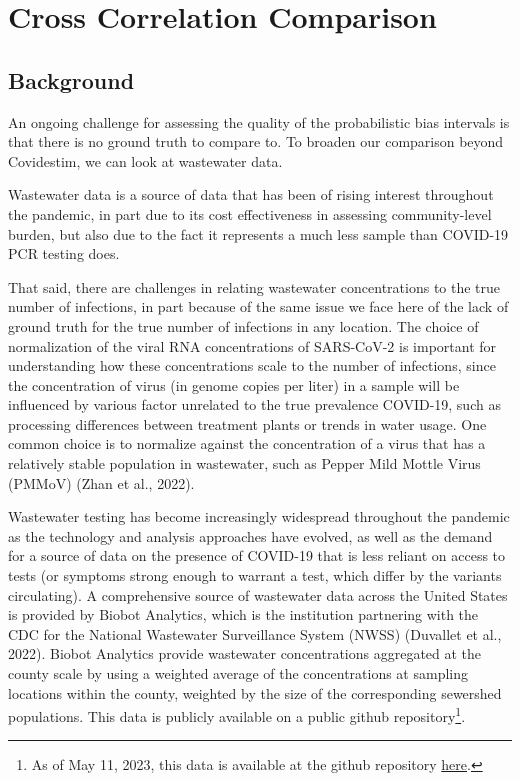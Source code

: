 \documentclass[12pt,twoside]{smiththesis}
\begin{document}
\hypertarget{cross-correlation-comparison}{%
\section{Cross Correlation Comparison}\label{cross-correlation-comparison}}

\hypertarget{background-1}{%
\subsection{Background}\label{background-1}}

An ongoing challenge for assessing the quality of the probabilistic bias intervals is that there is no ground truth to compare to. To broaden our comparison beyond Covidestim, we can look at wastewater data.

Wastewater data is a source of data that has been of rising interest throughout the pandemic, in part due to its cost effectiveness in assessing community-level burden, but also due to the fact it represents a much less sample than COVID-19 PCR testing does.

That said, there are challenges in relating wastewater concentrations to the true number of infections, in part because of the same issue we face here of the lack of ground truth for the true number of infections in any location. The choice of normalization of the viral RNA concentrations of SARS-CoV-2 is important for understanding how these concentrations scale to the number of infections, since the concentration of virus (in genome copies per liter) in a sample will be influenced by various factor unrelated to the true prevalence COVID-19, such as processing differences between treatment plants or trends in water usage. One common choice is to normalize against the concentration of a virus that has a relatively stable population in wastewater, such as Pepper Mild Mottle Virus (PMMoV) (Zhan et al., 2022).

Wastewater testing has become increasingly widespread throughout the pandemic as the technology and analysis approaches have evolved, as well as the demand for a source of data on the presence of COVID-19 that is less reliant on access to tests (or symptoms strong enough to warrant a test, which differ by the variants circulating). A comprehensive source of wastewater data across the United States is provided by Biobot Analytics, which is the institution partnering with the CDC for the National Wastewater Surveillance System (NWSS) (Duvallet et al., 2022). Biobot Analytics provide wastewater concentrations aggregated at the county scale by using a weighted average of the concentrations at sampling locations within the county, weighted by the size of the corresponding sewershed populations. This data is publicly available on a public github repository\footnote{As of May 11, 2023, this data is available at the github repository \href{https://github.com/biobotanalytics/covid19-wastewater-data}{here}.}.
\end{document}
